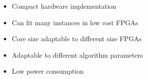 \begin{itemize}
\item Compact hardware implementation
\item Can fit many instances in low cost FPGAs
\item Core size adaptable to different size FPGAs
\item Adaptable to different algorithm parameters
\item Low power consumption
\end{itemize}
